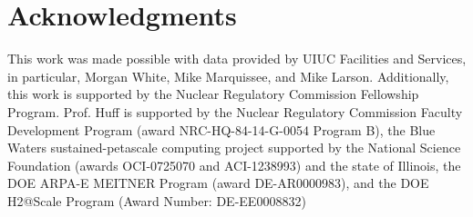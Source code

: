 \section{Acknowledgments}

This work was made possible with data provided by UIUC
Facilities and Services, in particular, Morgan White, Mike Marquissee, and Mike
Larson. Additionally, this work is supported by the Nuclear Regulatory
Commission Fellowship Program.
Prof. Huff is supported by the Nuclear Regulatory Commission Faculty Development Program (award NRC-HQ-84-14-G-0054 Program B), the Blue Waters sustained-petascale computing project supported by the National Science Foundation (awards OCI-0725070 and ACI-1238993) and the state of Illinois, the DOE ARPA-E MEITNER Program (award DE-AR0000983), and the DOE H2@Scale Program (Award Number: DE-EE0008832)

